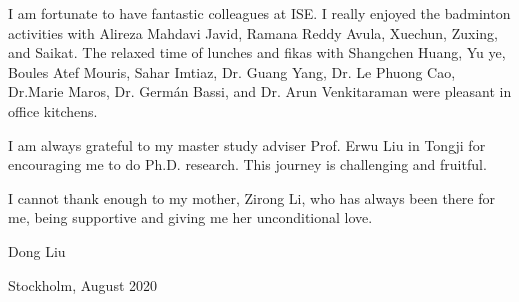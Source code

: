 I am fortunate to have fantastic colleagues at ISE. I really enjoyed the badminton activities with Alireza Mahdavi Javid, Ramana Reddy Avula, Xuechun, Zuxing, and Saikat. The relaxed time of lunches and fikas with Shangchen Huang, Yu ye, Boules Atef Mouris, Sahar Imtiaz, Dr. Guang Yang, Dr. Le Phuong Cao, Dr.Marie Maros, Dr. Germ\'{a}n Bassi, and Dr. Arun Venkitaraman were pleasant in office kitchens.

I am always grateful to my master study adviser Prof. Erwu Liu in Tongji for encouraging me to do Ph.D. research. This journey is challenging and fruitful.

I cannot thank enough to my mother, Zirong Li, who has always been there for me, being supportive and giving me her unconditional love. \newline
\newline


\hfill
Dong Liu

\hfill
Stockholm, August 2020








